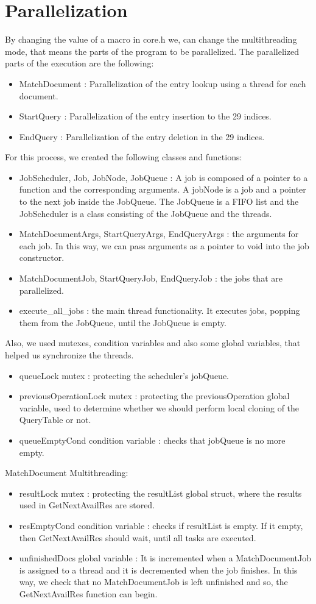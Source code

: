 \documentclass{article}
\begin{document}
\section{Parallelization}
By changing the value of a macro in core.h we, can change the multithreading mode, that means the parts of the program to be parallelized.
The parallelized parts of the execution are the following:
\begin{itemize}
\item MatchDocument : Parallelization of the entry lookup using a thread for each document.
\item StartQuery : Parallelization of the entry insertion to the 29 indices.
\item EndQuery : Parallelization of the entry deletion in the 29 indices.
\end{itemize}
For this process, we created the following classes and functions:
\begin{itemize}
\item JobScheduler, Job, JobNode, JobQueue : A job is composed of a pointer to a function and the corresponding arguments. A jobNode is a job and a pointer to the next job inside the JobQueue. The JobQueue is a FIFO list and the JobScheduler is a class consisting of the JobQueue and the threads.
\item MatchDocumentArgs, StartQueryArgs, EndQueryArgs : the arguments for each job. In this way, we can pass arguments as a pointer to void into the job constructor.
\item MatchDocumentJob, StartQueryJob, EndQueryJob :
the jobs that are parallelized.
\item execute\_all\_jobs : the main thread functionality. It executes jobs, popping them from the JobQueue, until the JobQueue is empty.
\end{itemize}
Also, we used mutexes, condition variables and also some global variables, that helped us synchronize the threads.
\begin{itemize}
\item queueLock mutex : protecting the scheduler's jobQueue.
\item previousOperationLock mutex : protecting the previousOperation global variable, used to determine whether we should perform local cloning of the QueryTable or not.
\item queueEmptyCond condition variable : checks that jobQueue is no more empty.
\end{itemize}
MatchDocument Multithreading:
\begin{itemize}
\item resultLock mutex : protecting the resultList global struct, where the results used in GetNextAvailRes are stored.
\item resEmptyCond condition variable : checks if resultList is empty. If it empty, then GetNextAvailRes should wait, until all tasks are executed.
\item unfinishedDocs global variable : It is incremented when a MatchDocumentJob is assigned to a thread and it is decremented when the job finishes. In this way, we check that no MatchDocumentJob is left unfinished and so, the GetNextAvailRes function can begin. 
\end{itemize}
\end{document}
